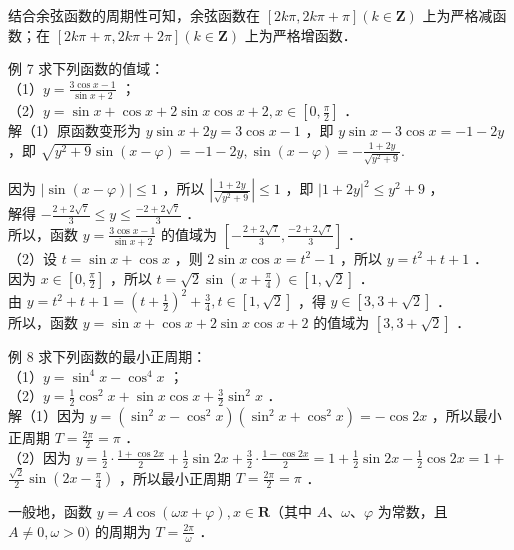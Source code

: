 \documentclass[10pt]{article}
\begin{document}
结合余弦函数的周期性可知，余弦函数在 \([2 k \pi, 2 k \pi+\pi](k \in \mathbf{Z})\) 上为严格减函数；在 \([2 k \pi+\pi, 2 k \pi+2 \pi](k \in \mathbf{Z})\) 上为严格增函数．

例 7 求下列函数的值域：\\
（1）\(y=\frac{3 \cos x-1}{\sin x+2}\) ；\\
（2）\(y=\sin x+\cos x+2 \sin x \cos x+2, x \in\left[0, \frac{\pi}{2}\right]\) ．\\
解（1）原函数变形为 \(y \sin x+2 y=3 \cos x-1\) ，即 \(y \sin x-3 \cos x=-1-2 y\) ，即 \(\sqrt{y^{2}+9} \sin (x-\varphi)=-1-2 y, \sin (x-\varphi)=-\frac{1+2 y}{\sqrt{y^{2}+9}}\).

因为 \(|\sin (x-\varphi)| \leqslant 1\) ，所以 \(\left|\frac{1+2 y}{\sqrt{y^{2}+9}}\right| \leqslant 1\) ，即 \(|1+2 y|^{2} \leqslant y^{2}+9\) ，\\
解得 \(-\frac{2+2 \sqrt{7}}{3} \leqslant y \leqslant \frac{-2+2 \sqrt{7}}{3}\) ．\\
所以，函数 \(y=\frac{3 \cos x-1}{\sin x+2}\) 的值域为 \(\left[-\frac{2+2 \sqrt{7}}{3}, \frac{-2+2 \sqrt{7}}{3}\right]\) ．\\
（2）设 \(t=\sin x+\cos x\) ，则 \(2 \sin x \cos x=t^{2}-1\) ，所以 \(y=t^{2}+t+1\) ．\\
因为 \(x \in\left[0, \frac{\pi}{2}\right]\) ，所以 \(t=\sqrt{2} \sin \left(x+\frac{\pi}{4}\right) \in[1, \sqrt{2}]\) ．\\
由 \(y=t^{2}+t+1=\left(t+\frac{1}{2}\right)^{2}+\frac{3}{4}, t \in[1, \sqrt{2}]\) ，得 \(y \in[3,3+\sqrt{2}]\) ．\\
所以，函数 \(y=\sin x+\cos x+2 \sin x \cos x+2\) 的值域为 \([3,3+\sqrt{2}]\) ．

例 8 求下列函数的最小正周期：\\
（1）\(y=\sin ^{4} x-\cos ^{4} x\) ；\\
（2）\(y=\frac{1}{2} \cos ^{2} x+\sin x \cos x+\frac{3}{2} \sin ^{2} x\) ．\\
解（1）因为 \(y=\left(\sin ^{2} x-\cos ^{2} x\right)\left(\sin ^{2} x+\cos ^{2} x\right)=-\cos 2 x\) ，所以最小正周期 \(T=\frac{2 \pi}{2}=\pi\) ．\\
（2）因为 \(y=\frac{1}{2} \cdot \frac{1+\cos 2 x}{2}+\frac{1}{2} \sin 2 x+\frac{3}{2} \cdot \frac{1-\cos 2 x}{2}=1+\frac{1}{2} \sin 2 x-\frac{1}{2} \cos 2 x=1+\) \(\frac{\sqrt{2}}{2} \sin \left(2 x-\frac{\pi}{4}\right)\) ，所以最小正周期 \(T=\frac{2 \pi}{2}=\pi\) ．

一般地，函数 \(y=A \cos (\omega x+\varphi), x \in \mathbf{R}\)（其中 \(A 、 \omega 、 \varphi\) 为常数，且 \(A \neq 0, \omega>0)\) 的周期为 \(T=\frac{2 \pi}{\omega}\) ．
\end{document}
